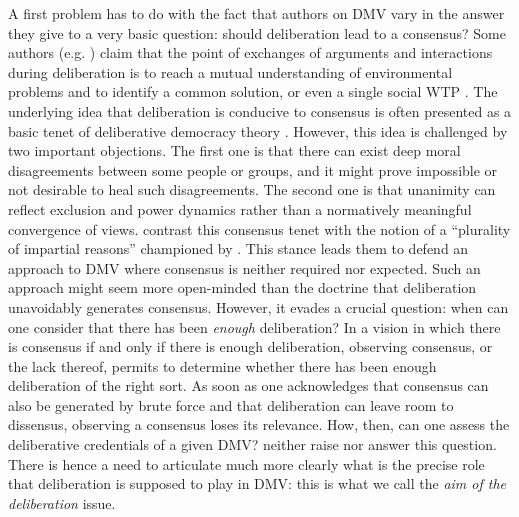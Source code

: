 \documentclass[version=3.21, pagesize, twoside=off, bibliography=totoc, DIV=calc, fontsize=12pt, a4paper, french, english]{scrartcl}
\begin{document}
A first problem has to do with the fact that authors on DMV vary in the answer they give to a very basic question: should deliberation lead to a consensus? Some authors (e.g. \citet{vatn_institutional_2009}) claim that the point of exchanges of arguments and interactions during deliberation is to reach a mutual understanding of environmental problems and to identify a common solution, or even a single social WTP \citep{orchard-webb_deliberative_2016}. The underlying idea that deliberation is conducive to consensus is often presented as a basic tenet of deliberative democracy theory \citep{wilson_discourse-based_2002}. 
However, this idea is challenged by two important objections.
The first one is that there can exist deep moral disagreements \citep{dryzek_deliberative_2013} between some people or groups, and it might prove impossible or not desirable to heal such disagreements.
The second one is that unanimity can reflect exclusion and power dynamics \citep{elster_sour_1983,volker_exploring_2016,vargas_background_2016,vargas_problem_2017,murphy_comparing_2017} rather than a normatively meaningful convergence of views.
\citeauthor{bartkowski_beyond_2018} contrast this consensus tenet with the notion of a ``plurality of impartial reasons'' championed by \citet{sen_idea_2009}.
This stance leads them to defend an approach to DMV where consensus is neither required nor expected. Such an approach might seem more open-minded than the doctrine that deliberation unavoidably generates consensus. However, it evades a crucial question: when can one consider that there has been \emph{enough} deliberation? 
In a vision in which there is consensus if and only if there is enough deliberation, observing consensus, or the lack thereof, permits to determine whether there has been enough deliberation of the right sort.
As soon as one acknowledges that consensus can also be generated by brute force and that deliberation can leave room to dissensus, observing a consensus loses its relevance. 
How, then, can one assess the deliberative credentials of a given DMV? 
\citeauthor{bartkowski_beyond_2018} neither raise nor answer this question.
There is hence a need to articulate much more clearly what is the precise role that deliberation is supposed to play in DMV: this is what we call the \emph{aim of the deliberation} issue.
\end{document}
